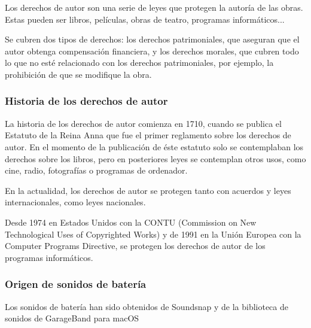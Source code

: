 \documentclass{article}
\begin{document}
            Los derechos de autor son una serie de leyes que protegen la autoría de las obras. Estas pueden ser libros,
            películas, obras de teatro, programas informáticos...\newline

            Se cubren dos tipos de derechos: los derechos patrimoniales, que aseguran que el autor obtenga compensación
            financiera, y los derechos morales, que cubren todo lo que no esté relacionado con los derechos
            patrimoniales, por ejemplo, la prohibición de que se modifique la obra.\cite{derechos_ompi}


        \subsubsection{Historia de los derechos de autor} %
        \label{ssub:HistoriaDeLosDerechosDeAutor}

            La historia de los derechos de autor comienza en 1710, cuando se publica el Estatuto de la Reina
            Anna\cite{estatuto_anna} que fue el primer reglamento sobre los derechos de autor. En el momento de la
            publicación de éste estatuto solo se contemplaban los derechos sobre los libros, pero en posteriores leyes
            se contemplan otros usos, como cine, radio, fotografías o programas de ordenador.\newline

            En la actualidad, los derechos de autor se protegen tanto con acuerdos y leyes internacionales, como leyes
            nacionales.\newline

            Desde 1974 en Estados Unidos con la CONTU\cite{contu} (Commission on New Technological Uses of Copyrighted
            Works) y de 1991 en la Unión Europea con la Computer Programs Directive\cite{com_pro_dir}, se protegen los
            derechos de autor de los programas informáticos.


        \subsubsection{Origen de sonidos de batería} %
        \label{ssub:OrigenDeSonidosDeBateria}

            Los sonidos de batería han sido obtenidos de Soundsnap\cite{soundsnap} y de la biblioteca de sonidos de
            GarageBand para macOS\cite{garageband}
\end{document}
